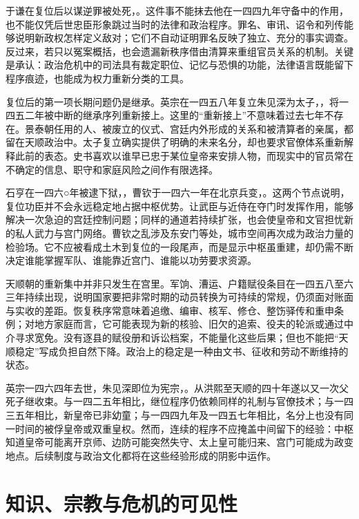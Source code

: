 于谦在复位后以谋逆罪被处死，。这件事不能抹去他在一四四九年守备中的作用，也不能仅凭后世忠臣形象跳过当时的法律和政治程序。罪名、审讯、诏令和列传能够说明新政权怎样定义敌对；它们不自动证明罪名反映了独立、充分的事实调查。反过来，若只以冤案概括，也会遗漏新秩序借由清算来重组官员关系的机制。关键是承认：政治危机中的司法具有裁定职位、记忆与恐惧的功能，法律语言既能留下程序痕迹，也能成为权力重新分类的工具。

复位后的第一项长期问题仍是继承。英宗在一四五八年复立朱见深为太子，，将一四五二年被中断的继承序列重新接上。这里的“重新接上”不意味着过去七年不存在。景泰朝任用的人、被废立的仪式、宫廷内外形成的关系和被清算者的亲属，都留在天顺政治中。太子复立确实提供了明确的未来名分，却也要求官僚体系重新解释此前的表态。史书喜欢以谁早已忠于某位皇帝来安排人物，而现实中的官员常在不确定的信息、职守和家庭风险之间作有限选择。

石亨在一四六○年被逮下狱，，曹钦于一四六一年在北京兵变，。这两个节点说明，复位功臣并不会永远稳定地占据中枢优势。让武臣与近侍在夺门时发挥作用，能够解决一次急迫的宫廷控制问题；同样的通道若持续扩张，也会使皇帝和文官担忧新的私人武力与宫门网络。曹钦之乱涉及东安门等处，城市空间再次成为政治力量的检验场。它不应被看成土木到复位的一段尾声，而是显示中枢虽重建，却仍需不断决定谁能掌握军队、谁能靠近宫门、谁能以功劳要求资源。

天顺朝的重新集中并非只发生在宫里。军饷、漕运、户籍赋役条目在一四五八至六三年持续出现，说明国家要把非常时期的动员转换为可持续的常规，仍须面对账面与实收的差距。恢复秩序常意味着追缴、编审、核军、修仓、整饬驿传和重申条例；对地方家庭而言，它可能表现为新的核验、旧欠的追索、役夫的轮派或通过中介寻求宽免。没有逐县的赋役册和诉讼档案，不能量化这些后果；但也不能把“天顺稳定”写成负担自然下降。政治上的稳定是一种由文书、征收和劳动不断维持的状态。

英宗一四六四年去世，朱见深即位为宪宗，。从洪熙至天顺的四十年遂以又一次父死子继收束。与一四二五年相比，继位程序仍依赖同样的礼制与官僚技术；与一四三五年相比，新皇帝已非幼童；与一四四九年及一四五七年相比，名分上也没有同一时间的被俘皇帝或双重皇权。然而，连续的程序不应掩盖中间留下的经验：中枢知道皇帝可能离开京师、边防可能突然失守、太上皇可能归来、宫门可能成为政变地点。后续制度与政治文化都将在这些经验形成的阴影中运作。

\section{知识、宗教与危机的可见性}

